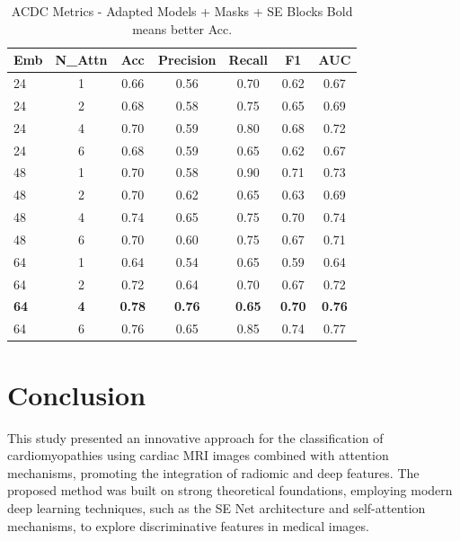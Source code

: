 \documentclass[journal,twoside,web]{ieeecolor}
\begin{document}
\begin{table}[htbp]
\centering
\caption{ACDC Metrics - Adapted Models + Masks + SE Blocks 
\newline Bold means better Acc.}
\begin{tabular}{lcccccc}
\toprule
\textbf{Emb} & \textbf{N\_Attn} & \textbf{Acc} & \textbf{Precision} & \textbf{Recall} & \textbf{F1} & \textbf{AUC} \\
\midrule
24 & 1 & 0.66 & 0.56 & 0.70 & 0.62 & 0.67 \\
24 & 2 & 0.68 & 0.58 & 0.75 & 0.65 & 0.69 \\
24 & 4 & 0.70 & 0.59 & 0.80 & 0.68 & 0.72 \\
24 & 6 & 0.68 & 0.59 & 0.65 & 0.62 & 0.67 \\
\hline
48 & 1 & 0.70 & 0.58 & 0.90 & 0.71 & 0.73 \\
48 & 2 & 0.70 & 0.62 & 0.65 & 0.63 & 0.69 \\
48 & 4 & 0.74 & 0.65 & 0.75 & 0.70 & 0.74 \\
48 & 6 & 0.70 & 0.60 & 0.75 & 0.67 & 0.71 \\
\hline
64 & 1 & 0.64 & 0.54 & 0.65 & 0.59 & 0.64 \\
64 & 2 & 0.72 & 0.64 & 0.70 & 0.67 & 0.72 \\
\textbf{64} & \textbf{4} & \textbf{0.78} & \textbf{0.76} & \textbf{0.65} & \textbf{0.70} & \textbf{0.76} \\
64 & 6 & 0.76 & 0.65 & 0.85 & 0.74 & 0.77 \\
\bottomrule
\end{tabular}
\label{tab:metrics_acdc_se}
\end{table}








\section{Conclusion}

This study presented an innovative approach for the classification of cardiomyopathies using cardiac \gls{MRI} images combined with attention mechanisms, promoting the integration of radiomic and deep features. The proposed method was built on strong theoretical foundations, employing modern deep learning techniques, such as the \gls{SE} Net architecture and self-attention mechanisms, to explore discriminative features in medical images.  
\end{document}
